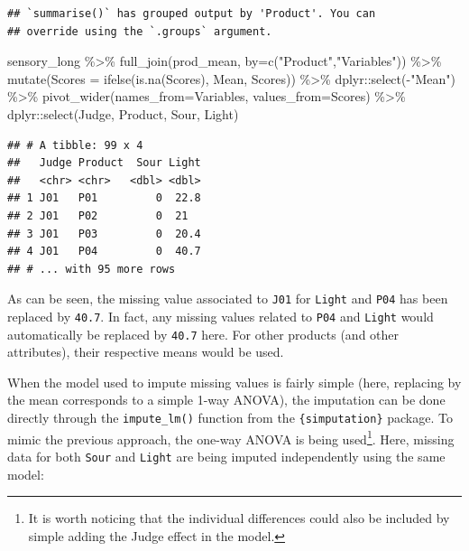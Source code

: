 \documentclass[
]{krantz}
\makeatletter
\newenvironment{Shaded}{\begin{snugshade}}{\end{snugshade}}
\newcommand{\AttributeTok}[1]{\textcolor[rgb]{0.61,0.61,0.61}{#1}}
\newcommand{\FunctionTok}[1]{\textcolor[rgb]{0,0,0}{#1}}
\newcommand{\NormalTok}[1]{#1}
\newcommand{\SpecialCharTok}[1]{\textcolor[rgb]{0,0,0}{#1}}
\newcommand{\StringTok}[1]{\textcolor[rgb]{0.5,0.5,0.5}{#1}}
\newenvironment{kframe}{%
\medskip{}
\setlength{\fboxsep}{.8em}
 \def\at@end@of@kframe{}%
 \ifinner\ifhmode%
  \def\at@end@of@kframe{\end{minipage}}%
  \begin{minipage}{\columnwidth}%
 \fi\fi%
 \def\FrameCommand##1{\hskip\@totalleftmargin \hskip-\fboxsep
 \colorbox{shadecolor}{##1}\hskip-\fboxsep
     \hskip-\linewidth \hskip-\@totalleftmargin \hskip\columnwidth}%
 \MakeFramed {\advance\hsize-\width
   \@totalleftmargin\z@ \linewidth\hsize
   \@setminipage}}%
 {\par\unskip\endMakeFramed%
 \at@end@of@kframe}
\renewenvironment{Shaded}{\begin{kframe}}{\end{kframe}}
\makeatother
\begin{document}
\begin{verbatim}
## `summarise()` has grouped output by 'Product'. You can
## override using the `.groups` argument.
\end{verbatim}

\begin{Shaded}
\begin{Highlighting}[]
\NormalTok{sensory\_long }\SpecialCharTok{\%\textgreater{}\%} 
  \FunctionTok{full\_join}\NormalTok{(prod\_mean, }\AttributeTok{by=}\FunctionTok{c}\NormalTok{(}\StringTok{"Product"}\NormalTok{,}\StringTok{"Variables"}\NormalTok{)) }\SpecialCharTok{\%\textgreater{}\%} 
  \FunctionTok{mutate}\NormalTok{(}\AttributeTok{Scores =} \FunctionTok{ifelse}\NormalTok{(}\FunctionTok{is.na}\NormalTok{(Scores), Mean, Scores)) }\SpecialCharTok{\%\textgreater{}\%} 
\NormalTok{  dplyr}\SpecialCharTok{::}\FunctionTok{select}\NormalTok{(}\SpecialCharTok{{-}}\StringTok{"Mean"}\NormalTok{) }\SpecialCharTok{\%\textgreater{}\%} 
  \FunctionTok{pivot\_wider}\NormalTok{(}\AttributeTok{names\_from=}\NormalTok{Variables, }\AttributeTok{values\_from=}\NormalTok{Scores) }\SpecialCharTok{\%\textgreater{}\%} 
\NormalTok{  dplyr}\SpecialCharTok{::}\FunctionTok{select}\NormalTok{(Judge, Product, Sour, Light)}
\end{Highlighting}
\end{Shaded}

\begin{verbatim}
## # A tibble: 99 x 4
##   Judge Product  Sour Light
##   <chr> <chr>   <dbl> <dbl>
## 1 J01   P01         0  22.8
## 2 J01   P02         0  21  
## 3 J01   P03         0  20.4
## 4 J01   P04         0  40.7
## # ... with 95 more rows
\end{verbatim}

As can be seen, the missing value associated to \texttt{J01} for \texttt{Light} and \texttt{P04} has been replaced by \texttt{40.7}. In fact, any missing values related to \texttt{P04} and \texttt{Light} would automatically be replaced by \texttt{40.7} here. For other products (and other attributes), their respective means would be used.

When the model used to impute missing values is fairly simple (here, replacing by the mean corresponds to a simple 1-way ANOVA), the imputation can be done directly through the \texttt{impute\_lm()} function from the \texttt{\{simputation\}} package. To mimic the previous approach, the one-way ANOVA is being used\footnote{It is worth noticing that the individual differences could also be included by simple adding the Judge effect in the model.}. Here, missing data for both \texttt{Sour} and \texttt{Light} are being imputed independently using the same model:
\end{document}
